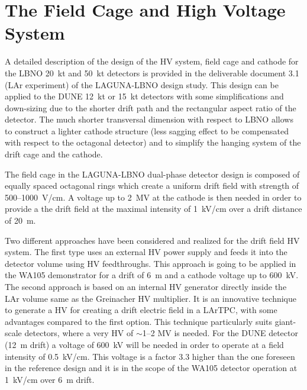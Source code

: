 \section{The Field Cage and High Voltage System} 
\label{sec:detectors-fd-alt-hv}

A detailed description of the design of the HV system, field cage and
cathode for the LBNO 20~kt and 50~kt detectors is provided in the
deliverable document 3.1 (LAr experiment) of the LAGUNA-LBNO design
study\cite{LAGUNA-LBNO-deliv}. This design can be applied to the DUNE
12~kt or 15~kt detectors with some simplifications and down-sizing
due to the shorter drift path and the rectangular aspect ratio of the
detector. The much shorter transversal dimension with respect to LBNO
allows to construct a lighter cathode structure (less sagging effect
to be compensated with respect to the octagonal detector) and to
simplify the hanging system of the drift cage and the cathode.

The field cage in the LAGUNA-LBNO dual-phase detector design is
composed of equally spaced octagonal rings which create a uniform
drift field with strength of 500--1000~V/cm. A voltage up to 2~MV at
the cathode is then needed in order to provide a the drift field at
the maximal intensity of 1~kV/cm over a drift distance of 20~m.

Two different approaches have been considered and realized for the
drift field HV system. The first type uses an external HV power supply
and feeds it into the detector volume using HV feedthroughs. This
approach is going to be applied in the WA105 demonstrator for a drift
of 6~m and a cathode voltage up to 600~kV.  The second approach is
based on an internal HV generator directly inside the LAr volume same
as the Greinacher HV multiplier. It is an innovative technique to
generate a HV for creating a drift electric field in a LArTPC, with
some advantages compared to the first option. This technique
particularly suits giant-scale detectors, where a very HV of
$\sim$1--2 MV is needed. For the DUNE detector (12~m drift) a voltage
of 600~kV will be needed in order to operate at a field intensity of
0.5~kV/cm. This voltage is a factor 3.3 higher than the one foreseen
in the reference design and it is in the scope of the WA105 detector
operation at 1~kV/cm over 6~m drift.

